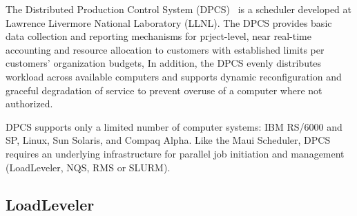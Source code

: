 The Distributed Production Control System (DPCS)~\cite{DPCS}
is a scheduler developed at Lawrence Livermore National Laboratory (LLNL). 
The DPCS provides basic data collection and reporting
mechanisms for prject-level, near real-time accounting and resource allocation
to customers with established limits per customers' organization budgets,
In addition, the DPCS evenly distributes workload across available computers
and supports dynamic reconfiguration and graceful degradation of service to prevent
overuse of a computer where not authorized.

DPCS supports only a 
limited number of computer systems: IBM RS/6000 and SP, Linux, 
Sun Solaris, and Compaq Alpha. 
Like the Maui Scheduler, DPCS requires an underlying infrastructure for 
parallel job initiation and management (LoadLeveler, NQS, RMS or SLURM).

\subsection*{LoadLeveler}


